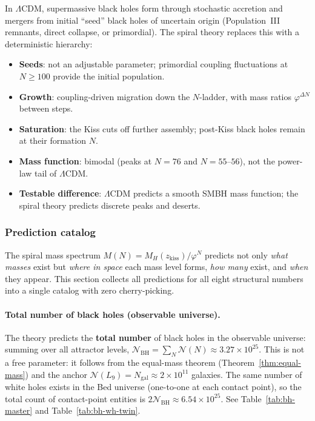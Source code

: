 \documentclass[12pt,a4paper]{article}
\newcommand{\bed}{Bed universe}
\begin{document}
In $\Lambda$CDM, supermassive black holes form through stochastic accretion and mergers from initial ``seed'' black holes of uncertain origin (Population~III remnants, direct collapse, or primordial).  The spiral theory replaces this with a deterministic hierarchy:
\begin{itemize}[nosep]
\item \textbf{Seeds}: not an adjustable parameter; primordial coupling fluctuations at $N \geq 100$ provide the initial population.
\item \textbf{Growth}: coupling-driven migration down the $N$-ladder, with mass ratios $\varphi^{\Delta N}$ between steps.
\item \textbf{Saturation}: the Kiss cuts off further assembly; post-Kiss black holes remain at their formation $N$.
\item \textbf{Mass function}: bimodal (peaks at $N = 76$ and $N = 55$--$56$), not the power-law tail of $\Lambda$CDM.
\item \textbf{Testable difference}: $\Lambda$CDM predicts a smooth SMBH mass function; the spiral theory predicts discrete peaks and deserts.
\end{itemize}


\subsubsection{Prediction catalog}
\label{sec:bh-predictions}

The spiral mass spectrum $M(N) = M_H(z_{\mathrm{kiss}})/\varphi^N$ predicts not only \emph{what masses} exist but \emph{where in space} each mass level forms, \emph{how many} exist, and \emph{when} they appear.  This section collects all predictions for all eight structural numbers into a single catalog with zero cherry-picking.

\paragraph{Total number of black holes (observable universe).}
The theory predicts the \textbf{total number} of black holes in the observable universe: summing over all attractor levels, $\mathcal{N}_{\mathrm{BH}} = \sum_N \mathcal{N}(N) \approx 3.27 \times 10^{25}$.  This is not a free parameter: it follows from the equal-mass theorem (Theorem~\ref{thm:equal-mass}) and the anchor $\mathcal{N}(L_9) = N_{\mathrm{gal}} \approx 2 \times 10^{11}$ galaxies.  The same number of white holes exists in the \bed{} (one-to-one at each contact point), so the total count of contact-point entities is $2\mathcal{N}_{\mathrm{BH}} \approx 6.54 \times 10^{25}$.  See Table~\ref{tab:bh-master} and Table~\ref{tab:bh-wh-twin}.
\end{document}
